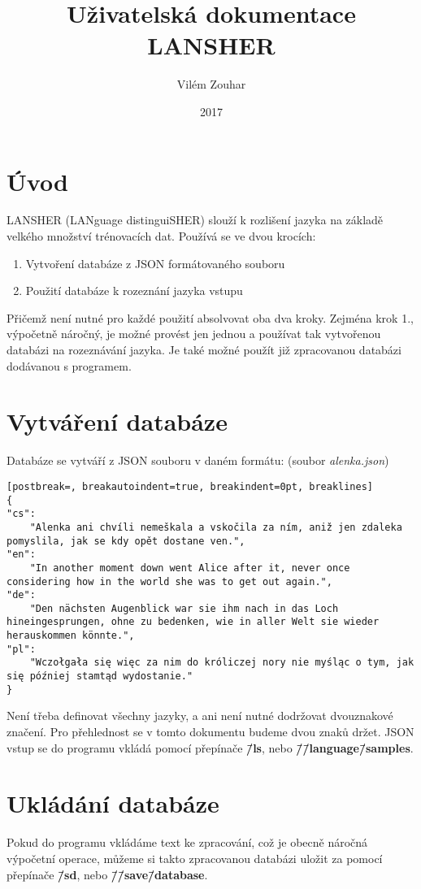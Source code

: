 \documentclass[11pt]{article}
\title{\textbf{Uživatelská dokumentace LANSHER }}
\author{Vilém Zouhar}
\date{2017}
\begin{document}
\maketitle

\section{Úvod} 
LANSHER (LANguage distinguiSHER) slouží k rozlišení jazyka na základě velkého množství trénovacích dat. Používá se ve dvou krocích:

\begin{enumerate}
\item Vytvoření databáze z JSON formátovaného souboru
\item Použití databáze k rozeznání jazyka vstupu
\end{enumerate}

Přičemž není nutné pro každé použití absolvovat oba dva kroky. Zejména krok 1., výpočetně náročný, je možné provést jen jednou a používat tak vytvořenou databázi na rozeznávání jazyka. Je také možné použít již zpracovanou databázi dodávanou s programem.

\section{Vytváření databáze}
Databáze se vytváří z JSON souboru v daném formátu: (soubor \textit{alenka.json})
\begin{lstlisting}[postbreak=, breakautoindent=true, breakindent=0pt, breaklines]
{
"cs":
	"Alenka ani chvíli nemeškala a vskočila za ním, aniž jen zdaleka pomyslila, jak se kdy opět dostane ven.",
"en": 
	"In another moment down went Alice after it, never once considering how in the world she was to get out again.",
"de":
	"Den nächsten Augenblick war sie ihm nach in das Loch hineingesprungen, ohne zu bedenken, wie in aller Welt sie wieder herauskommen könnte.",
"pl":
	"Wczołgała się więc za nim do króliczej nory nie myśląc o tym, jak się później stamtąd wydostanie."
}
\end{lstlisting}

Není třeba definovat všechny jazyky, a ani není nutné dodržovat dvouznakové značení. Pro přehlednost se v tomto dokumentu budeme dvou znaků držet. JSON vstup se do programu vkládá pomocí přepínače \textbf{\=/ls}, nebo \textbf{\=/\=/language\=/samples}.

\section{Ukládání databáze}
Pokud do programu vkládáme text ke zpracování, což je obecně náročná výpočetní operace, můžeme si takto zpracovanou databázi uložit za pomocí přepínače \textbf{\=/sd}, nebo \textbf{\=/\=/save\=/database}.
\end{document}
